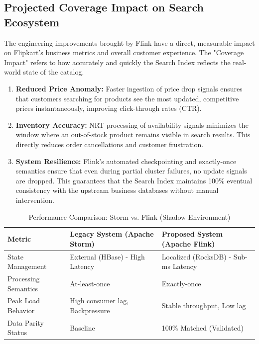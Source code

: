 \subsection{Projected Coverage Impact on Search Ecosystem}
\begin{justify}
    The engineering improvements brought by Flink have a direct, measurable impact on Flipkart's business metrics and overall customer experience. The "Coverage Impact" refers to how accurately and quickly the Search Index reflects the real-world state of the catalog.
    
    \begin{enumerate}
        \item \textbf{Reduced Price Anomaly:} Faster ingestion of price drop signals ensures that customers searching for products see the most updated, competitive prices instantaneously, improving click-through rates (CTR).
        \item \textbf{Inventory Accuracy:} NRT processing of availability signals minimizes the window where an out-of-stock product remains visible in search results. This directly reduces order cancellations and customer frustration.
        \item \textbf{System Resilience:} Flink's automated checkpointing and exactly-once semantics ensure that even during partial cluster failures, no update signals are dropped. This guarantees that the Search Index maintains 100\% eventual consistency with the upstream business databases without manual intervention.
    \end{enumerate}
\end{justify}

\begin{table}[h]
    \centering
    \small
    \caption{Performance Comparison: Storm vs. Flink (Shadow Environment)}
    \renewcommand{\arraystretch}{1.5}
    \begin{tabular}{|p{4cm}|p{5cm}|p{5cm}|}
        \hline
        \textbf{Metric} & \textbf{Legacy System (Apache Storm)} & \textbf{Proposed System (Apache Flink)} \\
        \hline
        State Management & External (HBase) - High Latency & Localized (RocksDB) - Sub-ms Latency \\
        \hline
        Processing Semantics & At-least-once & Exactly-once \\
        \hline
        Peak Load Behavior & High consumer lag, Backpressure & Stable throughput, Low lag \\
        \hline
        Data Parity Status & Baseline & 100\% Matched (Validated) \\
        \hline
    \end{tabular}
    \label{tab:performance_metrics}
\end{table}